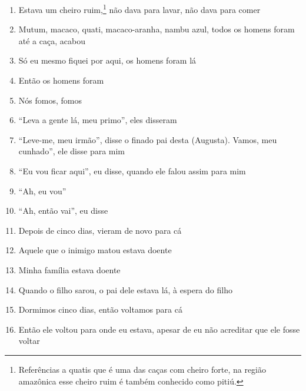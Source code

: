 \begin{enumerate}
 \item Estava um cheiro ruim,\footnote{Referências a quatis que é uma das
   caças com cheiro forte, na região amazônica esse cheiro ruim é também
   conhecido como pitiú.} não dava para lavar, não dava para comer

 \item Mutum, macaco, quati, macaco-aranha, nambu azul, todos os homens
 foram até a caça, acabou

 \item Só eu mesmo fiquei por aqui, os homens foram lá

 \item Então os homens foram

 \begin{center}\end{center}

 \item Nós fomos, fomos

 \item ``Leva a gente lá, meu primo'', eles disseram

 \item ``Leve-me, meu irmão'', disse o finado pai desta (Augusta).  Vamos,
 meu cunhado'', ele disse para mim

 \item ``Eu vou ficar aqui'', eu disse, quando ele falou assim para mim

 \item ``Ah, eu vou''

 \item ``Ah, então vai'', eu disse

 \begin{center}\end{center}

 \item Depois de cinco dias, vieram de novo para cá

 \item Aquele que o inimigo matou estava doente

 \item Minha família estava doente

 \item Quando o filho sarou, o pai dele estava lá, à espera do filho

 \item Dormimos cinco dias, então voltamos para cá

 \item Então ele voltou para onde eu estava, apesar de eu não acreditar que
 ele fosse voltar


\end{enumerate}
